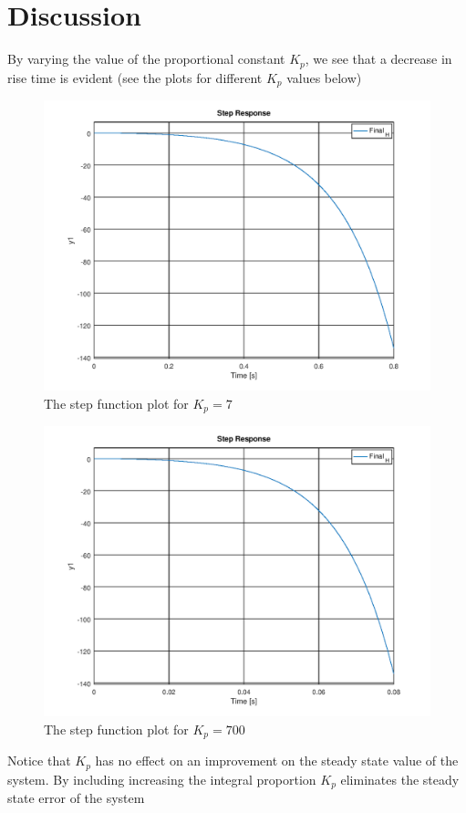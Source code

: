 \documentclass[a4paper, 12pt]{article}
\begin{document}
\section{Discussion} %
\label{sec:discussion}
By varying the value of the proportional constant $K_p$, we see that a decrease in rise time is evident (see the plots for different $K_p$ values below)
\begin{figure}[H]
	\centering
	\includegraphics[width=.4\linewidth]{K_p_7.png}
	\caption{The step function plot for $K_p = 7$}
	\label{fig:K_p_7}
\end{figure}%
\begin{figure}[H]
	\centering
	\includegraphics[width=.4\linewidth]{K_p_700.png}
	\caption{The step function plot for $K_p = 700$}
	\label{fig:K_p_700}
\end{figure}

Notice that $K_p$ has no effect on an improvement on the steady state value of the system. By including increasing the integral proportion $K_p$ eliminates the steady state error of the system

\end{document}
